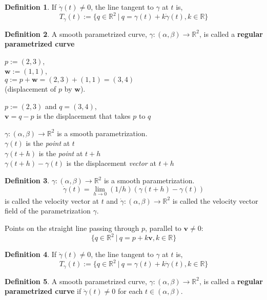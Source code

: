 \documentclass[twocolumn,20pt,fleqn]{extarticle}
\newcommand{\sep}{\vspace{0.5cm}}
\theoremstyle{plain}
\theoremstyle{definition}
\newtheorem*{definition}{Definition}
\theoremstyle{remark}
\begin{document}
\begin{definition}
  If $\dot{\gamma}(t)\neq 0$, the line tangent to $\gamma$ at $t$ is,
  \[T_\gamma(t):=\{q \in \mathbb{R}^2 \ |\ q = \gamma(t) + k\dot{\gamma}(t) , k\in \mathbb{R}\}\]
\end{definition}

\begin{definition}
  A smooth parametrized curve, $\gamma : (\alpha,\beta) \to \mathbb{R}^2$, is called a \textbf{regular parametrized curve}\end{definition}


\clearpage



$p := (2,3)$,\\ $\mathbf{w} := (1,1)$,\\ $q:=p + \mathbf{w} = (2,3) + (1,1) = (3,4)$ \\ (displacement of $p$ by $\mathbf{w}$).

\sep
$p := (2,3)$ and $q=(3,4)$,\\
$\mathbf{v}= q - p$ is the displacement that takes $p$ to $q$ 
\sep

$\gamma : (\alpha,\beta) \to \mathbb{R}^2$ is a smooth parametrization.\\
$\gamma(t)$ is the \emph{point} at $t$\\
$\gamma(t+h)$ is the \emph{point} at $t+h$\\
$\gamma(t+h)-\gamma(t)$ is the displacement \emph{vector} at $t+h$\\



\begin{definition}
$\gamma : (\alpha,\beta) \to \mathbb{R}^2$ is a smooth parametrization.
\[\dot{\gamma}(t) = \lim_{h\to 0} (1/h)(\gamma(t+h) - \gamma(t))\]
is called the velocity vector at $t$ and $\dot{\gamma} : (\alpha, \beta) \to \mathbb{R}^2$ is called the velocity vector field of the parametrization $\gamma$.
\end{definition}
\newpage
Points on the straight line passing through $p$, parallel to $\mathbf{v}\neq 0$:
\[\{q \in \mathbb{R}^2 \ |\ q = p  + k\mathbf{v} , k \in \mathbb{R}\}\]

\begin{definition}
  If $\dot{\gamma}(t)\neq 0$, the line tangent to $\gamma$ at $t$ is,
  \[T_\gamma(t):=\{q \in \mathbb{R}^2 \ |\ q = \gamma(t) + k\dot{\gamma}(t) , k\in \mathbb{R}\}\]
\end{definition}

\begin{definition}
  A smooth parametrized curve, $\gamma : (\alpha,\beta) \to \mathbb{R}^2$, is called a \textbf{regular parametrized curve} if $\dot{\gamma}(t) \neq 0$ for each  $t \in (\alpha,\beta)$.
\end{definition}
\end{document}
